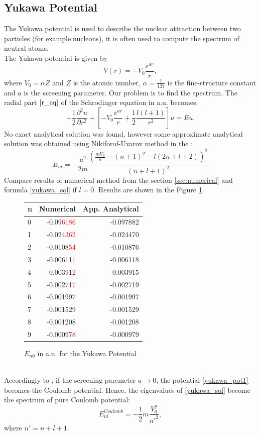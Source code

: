 \documentclass[a4paper, 12pt]{article}
\begin{document}
\subsection{Yukawa Potential}
The Yukawa potential is used to  describe the nuclear attraction between two particles (for example,nucleons), it is often used to compute the spectrum of neutral atoms.\\ 
The Yukawa potential is given by
\begin{equation}\label{yukawa_pot1}
    V(r) = -V_0\frac{e^{a r}}{r},
\end{equation}
where $V_0 = \alpha Z$ and $Z$ is the atomic number, $\alpha = \frac{1}{137}$ is the fine-structure constant and $a$ is the screening parameter.
Our problem is to find the spectrum. The radial part $\eqref{r_eq}$ of the Schrodinger equation in a.u. becomes:
$$-\frac{1}{2}\frac{\partial^2 u}{\partial r^2}+[-V_0\frac{e^{a r}}{r} +\frac{1}{2}\frac{l(l+1)}{r^2}]u = Eu.$$
No exact analytical solution was found, however some approximate analytical solution was obtained using Nikiforof-Uvarov method in the \cite{hamzavi2012approximate}: 
\begin{equation}\label{yukawa_sol}
    E_{nl} = -\frac{a^2}{2m}\frac{(\displaystyle{\frac{m V_0}{a}} - (n+1)^2 - l(2n+l+2))^2}{(n+l+1)^2}
\end{equation}
Compare results of numerical method from the section \ref{sec:numerical} and formula \eqref{yukawa_sol} if $l = 0$. Results are shown in the Figure \ref{fig:Yakawa_spec1}.
\begin{figure}[h!]
\centering
\begin{tabular}{lrr}
\toprule
{n} &  Numerical   &         App. Analytical \\
\midrule
0 & -0.09\textcolor{red}{6186} & -0.097882 \\
1 & -0.024\textcolor{red}{362} & -0.024470 \\
2 & -0.0108\textcolor{red}{54} & -0.010876 \\
3 & -0.00611\textcolor{red}{1} & -0.006118 \\
4 & -0.00391\textcolor{red}{2} & -0.003915 \\
5 & -0.00271\textcolor{red}{7} & -0.002719 \\
6 & -0.001997 & -0.001997 \\
7 & -0.001529 & -0.001529 \\
8 & -0.001208 & -0.001208 \\
9 & -0.00097\textcolor{red}{8} & -0.000979 \\
\bottomrule
\end{tabular}
\caption{$E_{n0}$ in a.u. for the Yukawa Potential}
\label{fig:Yakawa_spec1}
\end{figure}\\
Accordingly to \cite{hamzavi2012approximate}, if the screening paremeter $ a\to 0$, the potential \eqref{yukawa_pot1} becomes the Coulomb potential. Hence, the eigenvalues of \eqref{yukawa_sol} become the spectrum of pure Coulomb potential:
$$E_{nl}^{Coulomb} = -\frac{1}{2} m \frac{V_0^2}{n'^2},$$
where $n' = n+l+1.$
\end{document}
